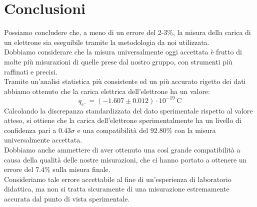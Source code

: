 \section{Conclusioni}
        Possiamo concludere che, a meno di un errore del 2-3\%, la misura della carica di un elettrone sia eseguibile tramite la metodologia da noi utilizzata.\\
        Dobbiamo considerare che la misura universalmente oggi accettata è frutto di molte più misurazioni di quelle prese dal nostro gruppo, con strumenti più raffinati e precisi.\\
        Tramite un'analisi statistica più consistente ed un più accurato rigetto dei dati abbiamo ottenuto che la carica elettrica dell'elettrone ha un valore:
        $$q_{e^-} = \left(-1.607\pm0.012\right)\cdot10^{-19}~\mathrm{C}$$
        Calcolando la discrepanza standardizzata del dato sperimentale rispetto al valore atteso, si ottiene che la carica dell'elettrone sperimentalmente ha un livello di confidenza pari a $0.43\sigma$ e una compatibilità del $92.80\%$ con la misura universalmente accettata.\\
        Dobbiamo anche ammettere di aver ottenuto una così grande compatibilità a causa della qualità delle nostre misurazioni, che ci hanno portato a ottenere un errore del $7.4\%$ sulla misura finale.\\
        Consideriamo tale errore accettabile al fine di un'esperienza di laboratorio didattica, ma non si tratta sicuramente di una misurazione estremamente accurata dal punto di vista sperimentale.
        